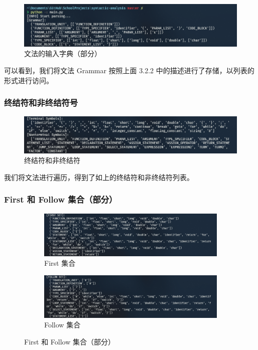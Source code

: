 \documentclass[UTF8]{ctexart}
\begin{document}
\begin{figure}[h]
  \includegraphics[width=\linewidth]{images/grammar.png}
  \caption{文法的输入字典（部分）}
  \label{fig:figure2}
\end{figure}

可以看到，我们将文法 Grammar 按照上面 3.2.2 中的描述进行了存储，以列表的形式进行访问。

\subsubsection{终结符和非终结符号}

\begin{figure}[h]
  \includegraphics[width=\linewidth]{images/term_non.png}
  \caption{终结符和非终结符}
  \label{fig:figure3}
\end{figure}

我们将文法进行遍历，得到了如上的终结符和非终结符列表。

\subsubsection{First 和 Follow 集合（部分）}

\begin{figure}[h]
  \begin{subfigure}{\textwidth}
    \includegraphics[width=\linewidth]{images/first.png}
    \caption{First 集合}
  \end{subfigure}
  \begin{subfigure}{\textwidth}
    \includegraphics[width=\linewidth]{images/follow.png}
    \caption{Follow 集合}
  \end{subfigure}
  \caption{First 和 Follow 集合（部分）}
  \label{fig:figure4}
\end{figure}
\end{document}

